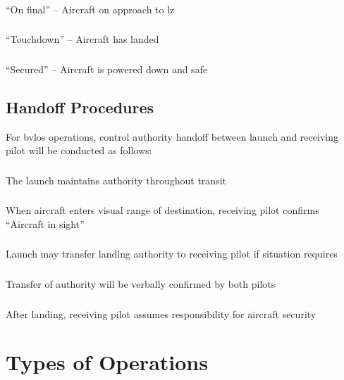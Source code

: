         \subsubsection{} ``On final'' -- Aircraft on approach to \ac{lz}
        \subsubsection{} ``Touchdown'' -- Aircraft has landed
        \subsubsection{} ``Secured'' -- Aircraft is powered down and safe

    \subsection{Handoff Procedures}\label{ssec:handoff}

        For \ac{bvlos} operations, control authority handoff between launch  and receiving pilot will be conducted as follows:

        \subsubsection{} The launch  maintains authority throughout transit
        \subsubsection{} When aircraft enters visual range of destination, receiving pilot confirms ``Aircraft in sight''
        \subsubsection{} Launch  may transfer landing authority to receiving pilot if situation requires
        \subsubsection{} Transfer of authority will be verbally confirmed by both pilots
        \subsubsection{} After landing, receiving pilot assumes responsibility for aircraft security

\section{Types of Operations}\label{sec:opstypes}
    
